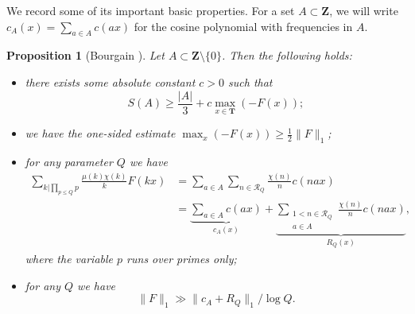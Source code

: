 \documentclass[11pt, reqno]{amsart}
\newtheorem{proposition}[theorem]{Proposition}
\begin{document}
We record some of its important basic properties. For a set $A\subset\mathbf{Z}$, we will write $c_{A}(x)=\sum_{a\in A}c(ax)$ for the cosine polynomial with frequencies in $A$.
\begin{proposition}[Bourgain \cite{bourgain}]\label{prop:basicestimate}
    Let $A\subset\mathbf{Z}\setminus\{0\}$. Then the following holds: 
    \begin{itemize}
        \item [(i)] there exists some absolute constant $c>0$ such that $$S(A)\geqslant \frac{|A|}{3}+c \max_{x\in \mathbf{T}}(-F(x));$$
        \item [(ii)] we have the one-sided estimate $\max_x(-F(x))\geqslant \frac{1}{2}\lVert F\rVert_1$;
        \item [(iii)] for any parameter $Q$ we have \begin{align*}\sum_{k|\prod_{p\leqslant Q}p}\frac{\mu(k)\chi(k)}{k}F(kx)&=\sum_{a\in A}\sum_{n\in\mathcal{R}_Q}\frac{\chi(n)}{n}c (nax)\\
        &= \underbrace{\sum_{a\in A}c( ax)}_{c_A(x)}+\underbrace{\sum_{\substack{1<n\in \mathcal{R}_Q\\ a\in A}}\frac{\chi(n)}{n} c (nax)}_{R_Q(x)},
        \end{align*}
        where the variable $p$ runs over primes only;
        \item [(iv)] for any $Q$ we have $$\lVert F\rVert_1\gg \lVert c_A+R_Q\rVert_1/\log Q.$$
    \end{itemize}
    
\end{proposition}
\end{document}
